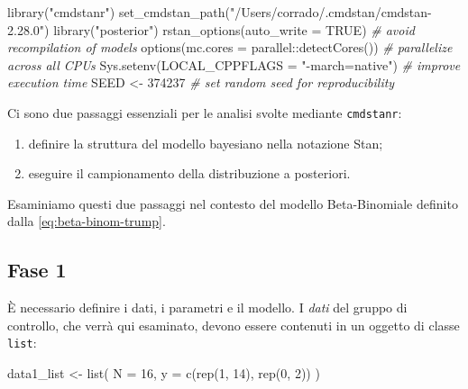 \documentclass[
  11pt,
  italian,
  a4paper,
  extrafontsizes,onecolumn,openright
  ]{memoir}
\newenvironment{Shaded}{\begin{snugshade}}{\end{snugshade}}
\newcommand{\AttributeTok}[1]{\textcolor[rgb]{0.77,0.63,0.00}{#1}}
\newcommand{\CommentTok}[1]{\textcolor[rgb]{0.56,0.35,0.01}{\textit{#1}}}
\newcommand{\ConstantTok}[1]{\textcolor[rgb]{0.00,0.00,0.00}{#1}}
\newcommand{\DecValTok}[1]{\textcolor[rgb]{0.00,0.00,0.81}{#1}}
\newcommand{\FunctionTok}[1]{\textcolor[rgb]{0.00,0.00,0.00}{#1}}
\newcommand{\NormalTok}[1]{#1}
\newcommand{\OtherTok}[1]{\textcolor[rgb]{0.56,0.35,0.01}{#1}}
\newcommand{\SpecialCharTok}[1]{\textcolor[rgb]{0.00,0.00,0.00}{#1}}
\newcommand{\StringTok}[1]{\textcolor[rgb]{0.31,0.60,0.02}{#1}}
\providecommand{\tightlist}{%
  \setlength{\itemsep}{0pt}\setlength{\parskip}{0pt}}
\begin{document}
\begin{Shaded}
\begin{Highlighting}[]
\FunctionTok{library}\NormalTok{(}\StringTok{"cmdstanr"}\NormalTok{)}
\FunctionTok{set\_cmdstan\_path}\NormalTok{(}\StringTok{"/Users/corrado/.cmdstan/cmdstan{-}2.28.0"}\NormalTok{)}
\FunctionTok{library}\NormalTok{(}\StringTok{"posterior"}\NormalTok{)}
\FunctionTok{rstan\_options}\NormalTok{(}\AttributeTok{auto\_write =} \ConstantTok{TRUE}\NormalTok{) }\CommentTok{\# avoid recompilation of models}
\FunctionTok{options}\NormalTok{(}\AttributeTok{mc.cores =}\NormalTok{ parallel}\SpecialCharTok{::}\FunctionTok{detectCores}\NormalTok{()) }\CommentTok{\# parallelize across all CPUs}
\FunctionTok{Sys.setenv}\NormalTok{(}\AttributeTok{LOCAL\_CPPFLAGS =} \StringTok{"{-}march=native"}\NormalTok{) }\CommentTok{\# improve execution time}
\NormalTok{SEED }\OtherTok{\textless{}{-}} \DecValTok{374237} \CommentTok{\# set random seed for reproducibility}
\end{Highlighting}
\end{Shaded}

Ci sono due passaggi essenziali per le analisi svolte mediante \texttt{cmdstanr}:

\begin{enumerate}
\def\labelenumi{\arabic{enumi}.}
\tightlist
\item
  definire la struttura del modello bayesiano nella notazione Stan;
\item
  eseguire il campionamento della distribuzione a posteriori.
\end{enumerate}

Esaminiamo questi due passaggi nel contesto del modello Beta-Binomiale definito dalla \eqref{eq:beta-binom-trump}.

\hypertarget{fase-1}{%
\subsection{Fase 1}\label{fase-1}}

È necessario definire i dati, i parametri e il modello. I \emph{dati} del gruppo di controllo, che verrà qui esaminato, devono essere contenuti in un oggetto di classe \texttt{list}:

\begin{Shaded}
\begin{Highlighting}[]
\NormalTok{data1\_list }\OtherTok{\textless{}{-}} \FunctionTok{list}\NormalTok{(}
  \AttributeTok{N =} \DecValTok{16}\NormalTok{,}
  \AttributeTok{y =} \FunctionTok{c}\NormalTok{(}\FunctionTok{rep}\NormalTok{(}\DecValTok{1}\NormalTok{, }\DecValTok{14}\NormalTok{), }\FunctionTok{rep}\NormalTok{(}\DecValTok{0}\NormalTok{, }\DecValTok{2}\NormalTok{))}
\NormalTok{)}
\end{Highlighting}
\end{Shaded}
\end{document}
